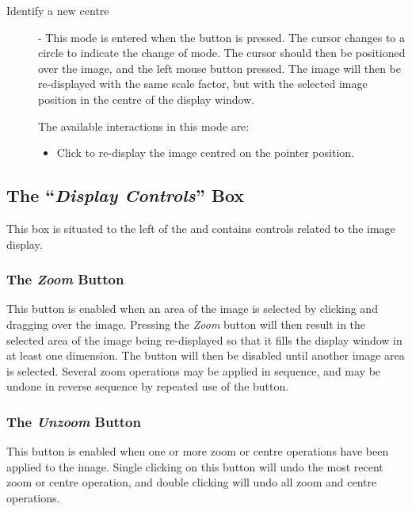 \begin{description}
\item [ Identify a new centre] - This mode is
entered when the  button is pressed.
The cursor changes to a circle to indicate the change of mode. The cursor
should then be positioned over the image, and the left mouse button
pressed. The image will then be re-displayed with the same scale factor,
but with the selected image position in the centre of the display window.

The available interactions in this mode are:
\begin{itemize}
\item Click to re-display the image centred on the pointer position.
\end{itemize}

\end{description}

\subsection {The ``{\em Display Controls}'' Box}
This box is situated to the left of the  and contains controls related to the image
display.

\subsubsection {The {\em Zoom} Button}
This button is enabled when an area of the image is selected by clicking
and dragging over the image. Pressing the {\em Zoom} button will then
result in the selected area of the image being re-displayed so that it
fills the display window in at least one dimension. The button will then
be disabled until another image area is selected. Several zoom operations
may be applied in sequence, and may be undone in reverse sequence by
repeated use of the  button. 

\subsubsection {The {\em Unzoom} Button}
This button is enabled when one or more zoom or centre operations have 
been applied to the image. Single clicking on this button will undo the
most recent zoom or centre operation, and double clicking will undo
all zoom and centre operations.

